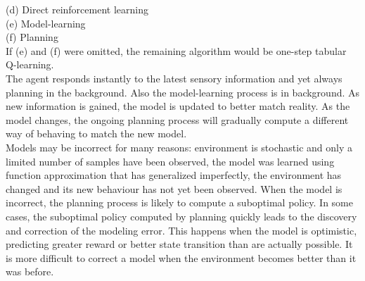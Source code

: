 \documentclass[10pt,landscape]{article}
\begin{document}
\begin{multicols}{3}
(d) Direct reinforcement learning\\
(e) Model-learning\\
(f) Planning\\


If (e) and (f) were omitted, the remaining algorithm would be one-step tabular Q-learning.\\

The agent responds instantly to the latest sensory information and yet always planning in the background. Also the model-learning process is in background. As new information is gained, the model is updated to better match reality. As the model changes, the ongoing planning process will gradually compute a different way of behaving to match the new model.\\

Models may be incorrect for many reasons: environment is stochastic and only a limited number of samples have been observed, the model was learned using function approximation that has generalized imperfectly, the environment has changed and its new behaviour has not yet been observed. 
When the model is incorrect, the planning process is likely to compute a suboptimal policy. In some cases, the suboptimal policy computed by planning quickly leads to the discovery and correction of the modeling error. This happens when the model is optimistic, predicting greater reward or better state transition than are actually possible. It is more difficult to correct a model when the environment becomes better than it was before.






\end{multicols}
\end{document}
